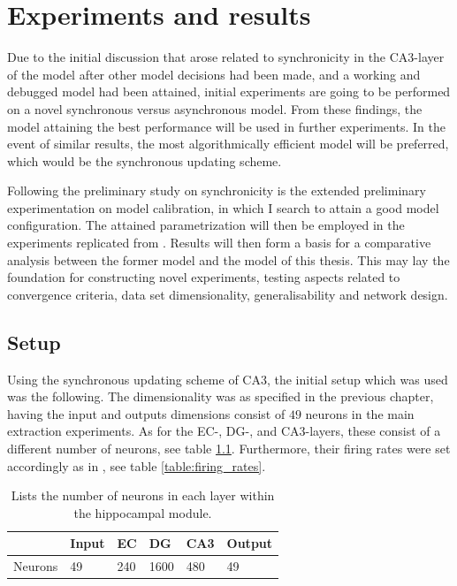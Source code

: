 
\chapter{Experiments and results}\label{chpt:experiments}

Due to the initial discussion that arose related to synchronicity in the CA3-layer of the model after other model decisions had been made, and a working and debugged model had been attained, initial experiments are going to be performed on a novel synchronous versus asynchronous model. From these findings, the model attaining the best performance will be used in further experiments. In the event of similar results, the most algorithmically efficient model will be preferred, which would be the synchronous updating scheme.

Following the preliminary study on synchronicity is the extended preliminary experimentation on model calibration, in which I search to attain a good model configuration. The attained parametrization will then be employed in the experiments replicated from \citep{Hattori2014}. Results will then form a basis for a comparative analysis between the former model and the model of this thesis. 
This may lay the foundation for constructing novel experiments, testing aspects related to convergence criteria, data set dimensionality, generalisability and network design.

\section{Setup}

Using the synchronous updating scheme of CA3, the initial setup which was used was the following. The dimensionality was as specified in the previous chapter, having the input and outputs dimensions consist of $49$ neurons in the main extraction experiments. As for the EC-, DG-, and CA3-layers, these consist of a different number of neurons, see table \ref{table:number_of_neurons}. Furthermore, their firing rates were set accordingly as in \citep{Hattori2014}, see table \ref{table:firing_rates}.

\begin{table}[]
\centering
\caption{Lists the number of neurons in each layer within the hippocampal module.}
\label{table:number_of_neurons}
\begin{tabular}{l|l|l|l|l|l|}
\cline{2-6}
                              & Input & EC  & DG   & CA3 & Output \\ \hline
\multicolumn{1}{|l|}{Neurons} & 49    & 240 & 1600 & 480 & 49     \\ \hline
\end{tabular}
\end{table}

